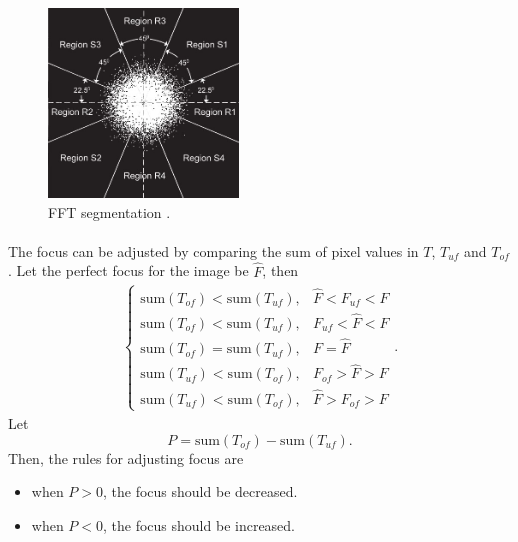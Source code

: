 \documentclass[12pt, twocolumn]{report}
\begin{document}
\begin{figure}[htbp]
    \centering
    \includegraphics[width=0.45\textwidth]{Figures/Correction algorithm FFT segmentation.jpg}
    \caption{FFT segmentation \cite{SEM correction algorithm}.}
    \label{Correction algorithm FFT segmentation}
\end{figure}

\paragraph{}
The focus can be adjusted by comparing the sum of pixel values in $T$, $T_{uf}$ and $T_{of}$. Let the perfect focus for the image be $\hat{F}$, then
\begin{align*}
\begin{cases}
    \text{sum}(T_{of}) < \text{sum}(T_{uf}), & \hat{F} < F_{uf} < F\\
    \text{sum}(T_{of}) < \text{sum}(T_{uf}), & F_{uf} < \hat{F} < F \\
    \text{sum}(T_{of}) = \text{sum}(T_{uf}), & F = \hat{F} \\
    \text{sum}(T_{uf}) < \text{sum}(T_{of}), & F_{of} > \hat{F} > F \\
    \text{sum}(T_{uf}) < \text{sum}(T_{of}), & \hat{F} > F_{of} > F
\end{cases}.
\end{align*}
Let
\begin{equation}
    P = \text{sum}(T_{of}) - \text{sum}(T_{uf}).
\end{equation}
Then, the rules for adjusting focus are
\begin{itemize}
    \item when $P>0$, the focus should be decreased.
    \item when $P<0$, the focus should be increased.
\end{itemize}
\end{document}
